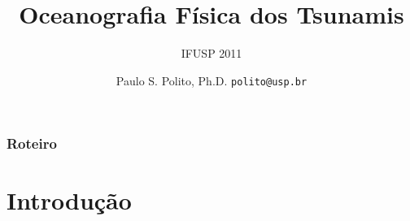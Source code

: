 \documentclass{beamer}
\title{Oceanografia Física dos Tsunamis}
\subtitle{IFUSP 2011}
\author[Paulo S. Polito]{Paulo S. Polito, Ph.D.  \hfill
  \texttt{polito@usp.br}}
\institute[IOUSP]{Instituto Oceanográfico da USP\\
\texttt{[image: logolos\_310.png]}}
\date{}
\begin{document}

\begin{frame}
\vspace{1.5cm}
  \titlepage
\end{frame}
\usebackgroundtemplate{}

\begin{frame}
  \frametitle{Roteiro}
  \tableofcontents
\end{frame}
\section{Introdução}
\end{document}
